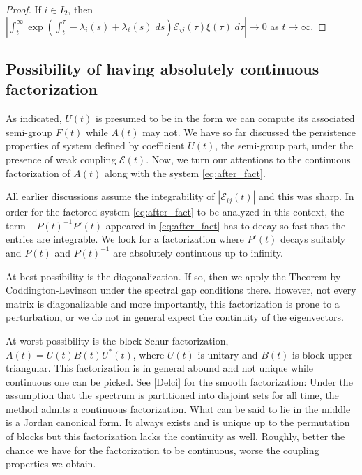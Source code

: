 \documentclass[a4paper,11pt]{article}
\def\red{\color{red}}
\newtheorem{proposition}{Proposition}[section]
\theoremstyle{remark}
\begin{document}
\begin{proof}
If $i\in I_2$, then $\left|\int_t^\infty \exp\left(\int_t^\tau -\lambda_i(s)+\lambda_\ell(s) \; ds\right)\mathcal{E}_{ij}(\tau)\xi(\tau) \; d\tau\right| \rightarrow 0$ as $t \rightarrow \infty$.
\end{proof}

\subsection{Possibility of having absolutely continuous factorization}
As indicated, $U(t)$ is presumed to be in the form we can compute its associated semi-group $F(t)$ while $A(t)$ may not. We have so far discussed the persistence properties of system defined by coefficient $U(t)$, the semi-group part, under the presence of weak coupling $\mathcal{E}(t)$.  Now, we turn our attentions to the continuous factorization of $A(t)$ along with the system \eqref{eq:after_fact}.

All earlier discussions assume the integrability of $|\mathcal{E}_{ij}(t)|$ and this was sharp. In order for the factored system \eqref{eq:after_fact} to be analyzed in this context, the term $-P(t)^{-1}P'(t)$ appeared in \eqref{eq:after_fact} has to decay so fast that the entries are integrable. We look for a factorization where $P'(t)$ decays suitably and $P(t)$ and $P(t)^{-1}$ are absolutely continuous up to infinity.

At best possibility is the diagonalization. If so, then we apply the Theorem by Coddington-Levinson under the spectral gap conditions there. However, not every matrix is diagonalizable and more importantly, this factorization is prone to a perturbation, or we do not in general expect the continuity of the eigenvectors.

At worst possibility is the block Schur factorization, $A(t)=U(t)B(t)U^*(t)$, where $U(t)$ is unitary and $B(t)$ is block upper triangular. This factorization is in general abound and not unique while continuous one can be picked. See [Delci] for the smooth factorization: Under the assumption that the spectrum is partitioned into disjoint sets for all time, the method admits a continuous factorization. What can be said to lie in the middle is a Jordan canonical form. It always exists and is unique up to the permutation of blocks but this factorization lacks the continuity as well. Roughly, better the chance we have for the factorization to be continuous, worse the coupling properties we obtain.


\cite{L1966}
\end{document}
